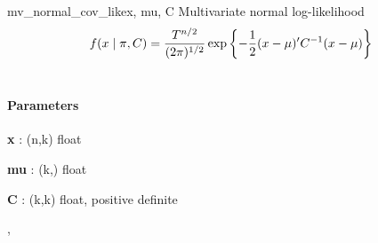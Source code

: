 \begin{funcdesc}{mv\_normal\_cov\_like}{x, mu, C}
\hypertarget{pymc.distributions.mv_normal_cov_like}{}
Multivariate normal log-likelihood
\begin{gather}
\begin{split}f(x \mid \pi, C) = \frac{T^{n/2}}{(2\pi)^{1/2}} \exp\left\{ -\frac{1}{2} (x-\mu)^{\prime}C^{-1}(x-\mu) \right\}\end{split}\notag\\\begin{split}\end{split}\notag
\end{gather}

\paragraph{Parameters}\begin{paramlist}

\item[] \textbf{x} : (n,k) float

\item[] \textbf{mu} : (k,) float

\item[] \textbf{C} : (k,k) float, positive definite
\end{paramlist}




\hyperlink{pymc.distributions.mv_normal_like}{}, \hyperlink{pymc.distributions.mv_normal_chol_like}{}


\end{funcdesc}


